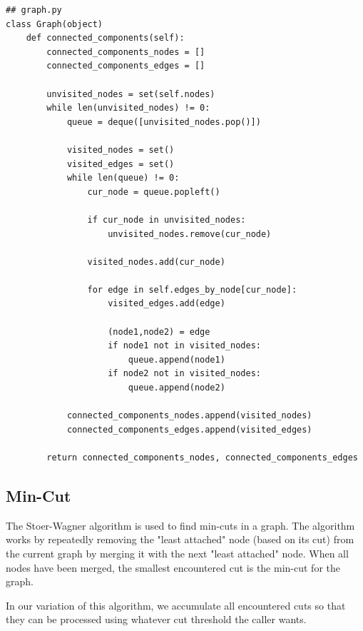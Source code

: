 \documentclass{article}
\begin{document}
\begin{lstlisting}
## graph.py
class Graph(object)
    def connected_components(self):
        connected_components_nodes = []
        connected_components_edges = []

        unvisited_nodes = set(self.nodes)
        while len(unvisited_nodes) != 0:
            queue = deque([unvisited_nodes.pop()])

            visited_nodes = set()
            visited_edges = set()
            while len(queue) != 0:
                cur_node = queue.popleft()

                if cur_node in unvisited_nodes:
                    unvisited_nodes.remove(cur_node)

                visited_nodes.add(cur_node)

                for edge in self.edges_by_node[cur_node]:
                    visited_edges.add(edge)

                    (node1,node2) = edge
                    if node1 not in visited_nodes:
                        queue.append(node1)
                    if node2 not in visited_nodes:
                        queue.append(node2)

            connected_components_nodes.append(visited_nodes)
            connected_components_edges.append(visited_edges)

        return connected_components_nodes, connected_components_edges
\end{lstlisting}

\subsection{Min-Cut}

The Stoer-Wagner algorithm is used
to find min-cuts in a graph.
The algorithm works by repeatedly removing
the "least attached" node (based on its cut)
from the current graph
by merging it with the next "least attached" node.
When all nodes have been merged,
the smallest encountered cut is the min-cut for the graph.

In our variation of this algorithm,
we accumulate all encountered cuts
so that they can be processed
using whatever cut threshold the caller wants.
\end{document}
